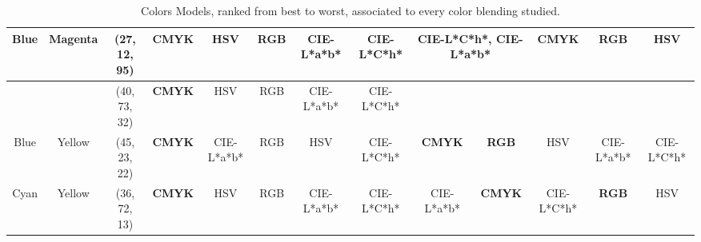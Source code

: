 \begin{table}[htbp]
{\begin{tabular}{@{}ccclcccccccccc@{}}
    Blue                    & \multicolumn{1}{c|}{Magenta}                   & \multicolumn{2}{c|}{\cellcolor[HTML]{8000FF}(27, 12, 95)}  & \multicolumn{1}{c|}{\textbf{CMYK}}                         & \multicolumn{1}{c|}{HSV}           & \multicolumn{1}{c|}{RGB}        & \multicolumn{1}{c|}{CIE-L*a*b*} & \multicolumn{1}{c|}{CIE-L*C*h*} & \multicolumn{2}{c|}{CIE-L*C*h*, CIE-L*a*b*}                                                                 & \multicolumn{1}{c|}{\textbf{CMYK}}                & \multicolumn{1}{c|}{\textbf{RGB}}                 & \multicolumn{1}{c|}{HSV}                          \\ \midrule
                            & \multicolumn{1}{c|}{}                          & \multicolumn{2}{c|}{\cellcolor[HTML]{00FF80}(40, 73, 32)}  & \multicolumn{1}{c|}{\textbf{CMYK}}                         & \multicolumn{1}{c|}{HSV}           & \multicolumn{1}{c|}{RGB}        & \multicolumn{1}{c|}{CIE-L*a*b*} & \multicolumn{1}{c|}{CIE-L*C*h*} & \multicolumn{1}{c|}{}                                & \multicolumn{1}{c|}{}                                & \multicolumn{1}{c|}{}                             & \multicolumn{1}{c|}{}                             & \multicolumn{1}{c|}{}                             \\ \cmidrule(lr){3-9}
    \multirow{-2}{*}{Blue}  & \multicolumn{1}{c|}{\multirow{-2}{*}{Yellow}}  & \multicolumn{2}{c|}{\cellcolor[HTML]{FF007F}(45, 23, 22)}  & \multicolumn{1}{c|}{\textbf{CMYK}}                         & \multicolumn{1}{c|}{CIE-L*a*b*}    & \multicolumn{1}{c|}{RGB}        & \multicolumn{1}{c|}{HSV}        & \multicolumn{1}{c|}{CIE-L*C*h*} & \multicolumn{1}{c|}{\multirow{-2}{*}{\textbf{CMYK}}} & \multicolumn{1}{c|}{\multirow{-2}{*}{\textbf{RGB}}}  & \multicolumn{1}{c|}{\multirow{-2}{*}{HSV}}        & \multicolumn{1}{c|}{\multirow{-2}{*}{CIE-L*a*b*}} & \multicolumn{1}{c|}{\multirow{-2}{*}{CIE-L*C*h*}} \\ \midrule
    Cyan                    & \multicolumn{1}{c|}{Yellow}                    & \multicolumn{2}{c|}{\cellcolor[HTML]{00FF00}(36, 72, 13)}  & \multicolumn{1}{c|}{\textbf{CMYK}}                         & \multicolumn{1}{c|}{HSV}           & \multicolumn{1}{c|}{RGB}        & \multicolumn{1}{c|}{CIE-L*a*b*} & \multicolumn{1}{c|}{CIE-L*C*h*} & \multicolumn{1}{c|}{CIE-L*a*b*}                      & \multicolumn{1}{c|}{\textbf{CMYK}}                   & \multicolumn{1}{c|}{CIE-L*C*h*}                   & \multicolumn{1}{c|}{\textbf{RGB}}                 & \multicolumn{1}{c|}{HSV}                          \\ \bottomrule
  \end{tabular}}
  \caption[Colors Models, ranked from best to worst, associated to every color blending studied.]{Colors Models, ranked from best to worst, associated to every color blending studied.}
  \label{table:blendings_models_rank}
\end{table}
%
